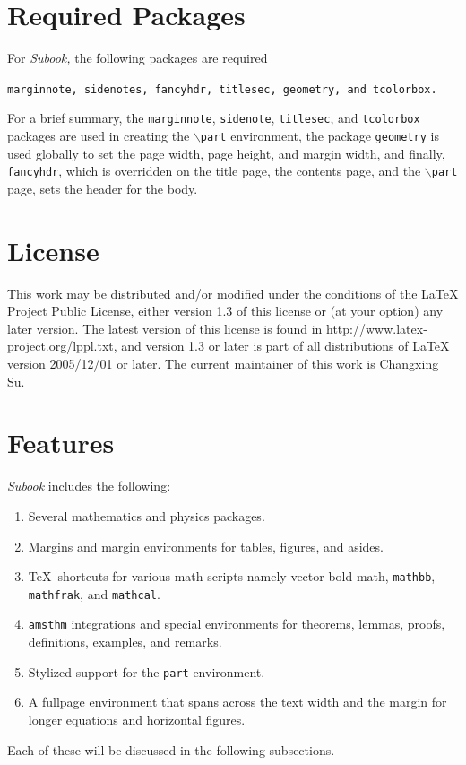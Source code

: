\documentclass[]{subook}
\begin{document}
\section{Required Packages}\label{sec:reqpackages}
For \textit{Subook,} the following packages are required
\begin{center}
    \texttt{marginnote, sidenotes, fancyhdr, titlesec, geometry, and tcolorbox.}
\end{center}
For a brief summary, the \texttt{marginnote}, \texttt{sidenote}, \texttt{titlesec}, 
and \texttt{tcolorbox} packages are used in creating the \texttt{$\backslash$part} environment, 
the package \texttt{geometry} is used globally to set the page width, page height, 
and margin width, and finally, \texttt{fancyhdr}, 
which is overridden on the title page, 
the contents page, and the \texttt{$\backslash$part} page, sets the header for the body.


\section{License}\label{sec:license}
This work may be distributed and/or modified under the conditions of the LaTeX Project Public License, 
either version 1.3 of this license or (at your option) any later version. 
The latest version of this license is found in  \url{http://www.latex-project.org/lppl.txt}, 
and version 1.3 or later is part of all distributions of LaTeX version 2005/12/01 or later. 
The current maintainer of this work is Changxing Su.

\section{Features}\label{sec:Features}

\textit{Subook} includes the following:
	\begin{enumerate}
		\item Several mathematics and physics packages.
		\item Margins and margin environments for tables, figures, and asides.
		\item \TeX\ shortcuts for various math scripts namely vector bold math, \texttt{mathbb}, \texttt{mathfrak}, and \texttt{mathcal}.
		\item \texttt{amsthm} integrations and special environments for theorems, lemmas, proofs, definitions, examples, and remarks.\
		\item Stylized support for the \texttt{part} environment.
		\item A fullpage environment that spans across the text width and the margin for longer equations and horizontal figures.
	\end{enumerate}
    Each of these will be discussed in the following subsections.
\end{document}
